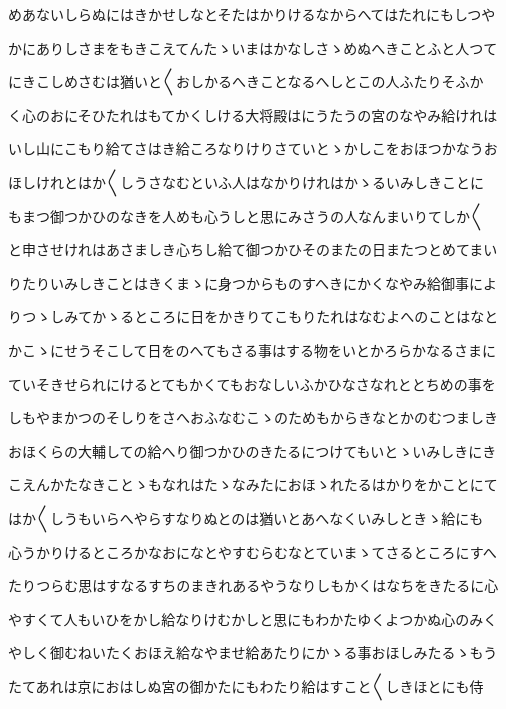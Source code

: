 \documentclass[a4paper,11pt,landscape]{ltjtarticle}
\begin{document}
\par\medskip
めあないしらぬにはきかせしなとそたはかりけるなからへてはたれにもしつや
\par\medskip
かにありしさまをもきこえてんたゝいまはかなしさゝめぬへきことふと人つて
\par\medskip
にきこしめさむは猶いと〱おしかるへきことなるへしとこの人ふたりそふか
\par\medskip
く心のおにそひたれはもてかくしける大将殿はにうたうの宮のなやみ給けれは
\par\medskip
いし山にこもり給てさはき給ころなりけりさていとゝかしこをおほつかなうお
\par\medskip
ほしけれとはか〱しうさなむといふ人はなかりけれはかゝるいみしきことに
\par\medskip
もまつ御つかひのなきを人めも心うしと思にみさうの人なんまいりてしか〱
\par\medskip
と申させけれはあさましき心ちし給て御つかひそのまたの日またつとめてまい
\par\medskip
りたりいみしきことはきくまゝに身つからものすへきにかくなやみ給御事によ
\par\medskip
りつゝしみてかゝるところに日をかきりてこもりたれはなむよへのことはなと
\par\medskip
かこゝにせうそこして日をのへてもさる事はする物をいとかろらかなるさまに
\par\medskip
ていそきせられにけるとてもかくてもおなしいふかひなさなれととちめの事を
\par\medskip
しもやまかつのそしりをさへおふなむこゝのためもからきなとかのむつましき
\par\medskip
おほくらの大輔しての給へり御つかひのきたるにつけてもいとゝいみしきにき
\par\medskip
こえんかたなきことゝもなれはたゝなみたにおほゝれたるはかりをかことにて
\par\medskip
はか〱しうもいらへやらすなりぬとのは猶いとあへなくいみしときゝ給にも
\par\medskip
心うかりけるところかなおになとやすむらむなとていまゝてさるところにすへ
\par\medskip
たりつらむ思はすなるすちのまきれあるやうなりしもかくはなちをきたるに心
\par\medskip
やすくて人もいひをかし給なりけむかしと思にもわかたゆくよつかぬ心のみく
\par\medskip
やしく御むねいたくおほえ給なやませ給あたりにかゝる事おほしみたるゝもう
\par\medskip
たてあれは京におはしぬ宮の御かたにもわたり給はすこと〱しきほとにも侍
\par\medskip
\end{document}
